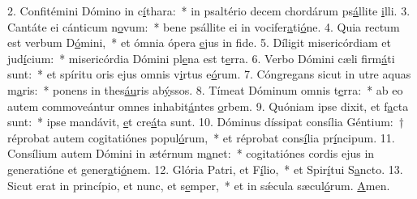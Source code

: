 2. Confitémini Dómino in c\uline{í}thara:~* in psaltério decem chordárum ps\uline{á}llite \uline{i}lli.
3. Cantáte ei cánticum n\uline{o}vum:~* bene psállite ei in vocifer\uline{a}ti\uline{ó}ne.
4. Quia rectum est verbum D\uline{ó}mini,~* et ómnia ópera \uline{e}jus in f\uline{i}de.
5. Díligit misericórdiam et jud\uline{í}cium:~* misericórdia Dómini pl\uline{e}na est t\uline{e}rra.
6. Verbo Dómini cæli firm\uline{á}ti sunt:~* et spíritu oris ejus omnis v\uline{i}rtus e\uline{ó}rum.
7. Cóngregans sicut in utre aquas m\uline{a}ris:~* ponens in thes\uline{áu}ris ab\uline{ý}ssos.
8. Tímeat Dóminum omnis t\uline{e}rra:~* ab eo autem commoveántur omnes inhabit\uline{á}ntes \uline{o}rbem.
9. Quóniam ipse dixit, et f\uline{a}cta sunt:~* ipse mandávit, \uline{e}t cre\uline{á}ta sunt.
10. Dóminus díssipat consília Géntium:~† réprobat autem cogitatiónes popul\uline{ó}rum,~* et réprobat cons\uline{í}lia pr\uline{í}ncipum.
11. Consílium autem Dómini in ætérnum m\uline{a}net:~* cogitatiónes cordis ejus in generatióne et gener\uline{a}ti\uline{ó}nem.
12. Glória Patri, et F\uline{í}lio,~* et Spir\uline{í}tui S\uline{a}ncto.
13. Sicut erat in princípio, et nunc, et s\uline{e}mper,~* et in sǽcula sæcul\uline{ó}rum. \uline{A}men.
